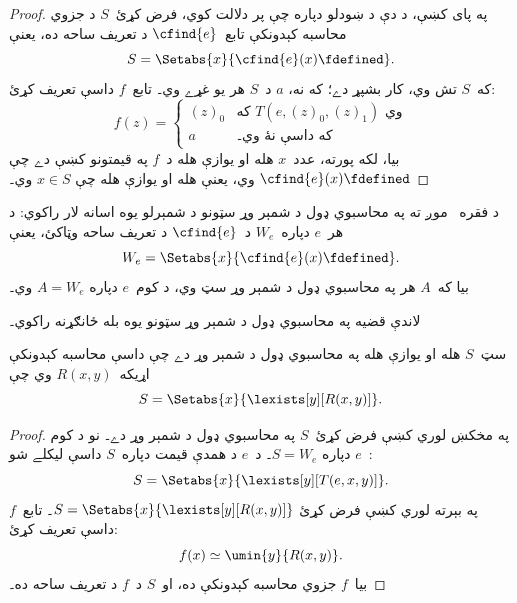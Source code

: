 \documentclass[../../../include/open-logic-section]{subfiles}
\begin{document}
\begin{proof}
په پای کښې، د دې د ښودلو دپاره چې  پر
 دلالت کوي، فرض کړئ~$S$ د جزوي محاسبه کېدونکې
تابع~$\cfind{e}$ د تعريف ساحه ده، يعنې
\[
S = \Setabs{x}{\cfind{e}(x) \fdefined}.
\]
که~$S$ تش وي، کار بشپړ دے؛ که نه، $a$ د~$S$ هر يو غړے وي۔ تابع~$f$
داسې تعريف کړئ:
\[
f(z) = \begin{cases}
(z)_0 & \text{که $T(e,(z)_0,(z)_1)$ وي} \\
a & \text{که داسې نۀ وي۔}
\end{cases}
\]
بيا، لکه پورته، عدد~$x$ هله او يوازې هله د~$f$ په قيمتونو کښې دے
چې $\cfind{e}(x) \fdefined$ وي، يعنې هله او يوازې هله چې $x \in S$
وي۔ 
\end{proof}

د  فقره~ موږ ته په
محاسبوي ډول د شمېر وړ سټونو د شمېرلو يوه اسانه لار راکوي: د هر~$e$
دپاره~$W_e$ د~$\cfind{e}$ د تعريف ساحه وټاکئ، يعنې
\[
W_e = \Setabs{x}{\cfind{e}(x) \fdefined}.
\]
بيا که~$A$ هر په محاسبوي ډول د شمېر وړ سټ وي، د کوم~$e$ دپاره
$A = W_e$ وي۔

لاندې قضيه په محاسبوي ډول د شمېر وړ سټونو يوه بله ځانګړنه راکوي۔

\begin{thm}
سټ~$S$ هله او يوازې هله په محاسبوي ډول د شمېر وړ دے چې داسې محاسبه
کېدونکې اړيکه~$R(x,y)$ وي چې
\[
S = \Setabs{ x }{ \lexists[y][R(x,y)] }.
\]
\end{thm}

\begin{proof}
په مخکښ لوري کښې فرض کړئ~$S$ په محاسبوي ډول د شمېر وړ دے۔ نو د کوم
~$e$ دپاره $S = W_e$۔ د~$e$ د همدې قيمت دپاره~$S$ داسې ليکلے شو:
\[
S = \Setabs{ x }{ \lexists[y][T(e, x, y)] }.
\]
په بېرته لوري کښې فرض کړئ $S = \Setabs{ x }{
  \lexists[y][R(x, y)] }$۔ تابع~$f$ داسې تعريف کړئ:
\[
f(x) \simeq \umin{y}{R(x, y)}.
\]
بيا~$f$ جزوي محاسبه کېدونکې ده، او~$S$ د~$f$ د تعريف ساحه ده۔
\end{proof}
\end{document}

